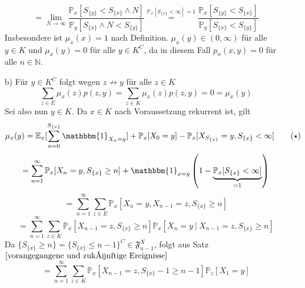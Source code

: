 \begin{itemize}
\begin{equation*}
\end{equation*}
\begin{equation*}
= \lim_{N \to \infty} \dfrac{\mathbb{P}_{x}[S_{\lbrace y \rbrace} < S_{\lbrace x \rbrace} \wedge N ]}{\mathbb{P}_{y}[S_{\lbrace x \rbrace} \wedge N < S_{\lbrace y \rbrace}]} \stackrel{\mathbb{P}_{x}[S_{\lbrace x \rbrace} < \infty]=1}{=} \dfrac{\mathbb{P}_{x}[S_{\lbrace y \rbrace} < S_{\lbrace x \rbrace}]}{\mathbb{P}_{y}[S_{\lbrace x \rbrace} < S_{\lbrace y \rbrace}]}
\end{equation*}
Insbesondere ist $\mu_{x}(x) =1$ nach Definition. $\mu_{x}(y) \in (0, \infty)$ für alle $y \in K$ und $\mu_{x}(y) = 0$ für alle $y \in K^{C}$, da in diesem Fall $p_{n}(x,y) = 0$ für alle $n \in \mathbb{N}$.
\item[b)] Für $y \in K^{C}$ folgt wegen $z \not\rightarrow y$ für alle $z \in K$
\begin{equation*}
\sum_{z \in E} \mu_{x}(z)p(z,y) = \sum_{z \in K}\mu_{x}(z)p(z,y) = 0 = \mu_{x}(y)
\end{equation*}
Sei also nun $y \in K$. Da $x \in K$ nach Voraussetzung rekurrent ist, gilt
\begin{equation*}
\mu_{x}(y) = \mathbb{E}_{x}[\sum_{n=0}^{S_{\lbrace x \rbrace}}  \mathbbm{1}_{X_{n} = y}] + \mathbb{P}_{x}[X_{0} = y] - \mathbb{P}_{x}[X_{S_{\lbrace x \rbrace}} = y, S_{\lbrace x \rbrace} < \infty]  \qquad (\star)
\end{equation*} 
\begin{equation*}
= \sum_{n=1}^{\infty} \mathbb{P}_{x}[X_{n}=y, S_{\lbrace x \rbrace} \geq n] + \mathbbm{1}_{x=y} \left( 1 - \underbrace{\mathbb{P}_{x}[S_{\lbrace x \rbrace} < \infty]}_{=1} \right)
\end{equation*}
\begin{equation*}
= \sum_{n=1}^{\infty} \sum_{z \in E}\mathbb{P}_{x}[X_{n}=y, X_{n-1} = z, S_{\lbrace x \rbrace} \geq n]
\end{equation*}
\begin{equation*}
= \sum_{n=1}^{\infty} \sum_{z \in K}\mathbb{P}_{x}[X_{n-1} = z, S_{\lbrace x \rbrace} \geq n]\mathbb{P}_{x}[X_{n}=y \: | \: X_{n-1} = z, S_{\lbrace x \rbrace} \geq n]
\end{equation*}
Da $\lbrace S_{\lbrace x \rbrace} \geq n \rbrace = {\lbrace S_{\lbrace x \rbrace} \leq n-1 \rbrace}^{C} \in \mathfrak{F}^{X}_{n-1} $, folgt aus Satz $\ref{vorangegangene und zukünftige Ereignisse}$
\begin{equation*}
= \sum_{n=1}^{\infty} \sum_{z \in K}\mathbb{P}_{x}[X_{n-1} = z, S_{\lbrace x \rbrace} - 1 \geq n-1]\mathbb{P}_{z}[X_{1}=y]

\end{equation*}
\end{itemize}
